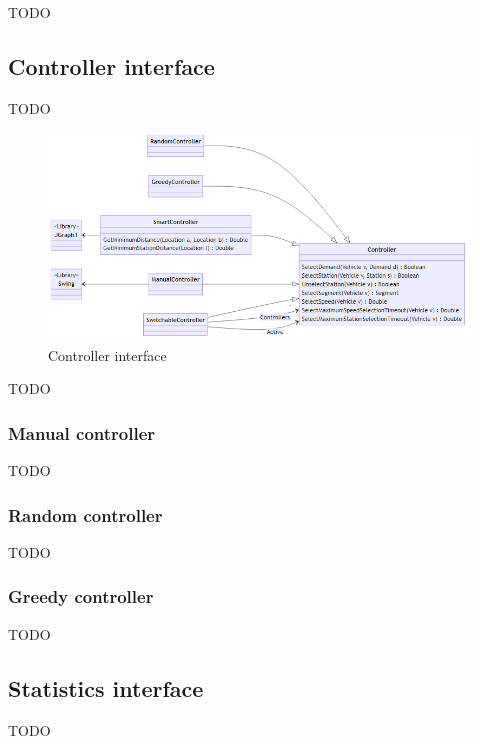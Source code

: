 \documentclass[11pt,twocolumn]{article}
\begin{document}
TODO

\subsection{Controller interface}
\label{sec:controller-interface}

TODO

\begin{figure}[htbp]
    \includegraphics[width=\columnwidth]{../../diagrams/controller/classes.png}
    \caption{Controller interface}
    \label{fig:controller-interface}
\end{figure}

TODO

\subsubsection{Manual controller}

TODO

\subsubsection{Random controller}

TODO

\subsubsection{Greedy controller}

TODO

\subsection{Statistics interface}
\label{sec:statistics-interface}

TODO
\end{document}
